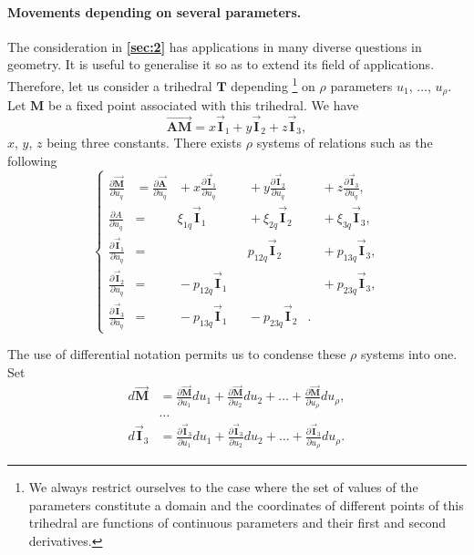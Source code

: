 \documentclass[leqno,11pt]{book}
\numberwithin{equation}{chapter}
\newcommand{\pd}{\partial}
\theoremstyle{shape1}
\theoremstyle{shapesmall}
\newcommand{\fsref}[1]{{\rm\textsection\textbf{\ref{sec:#1}}}}
\newcommand{\rvec}[1]{\vec{\mathbf{#1}}}
\newcommand{\ivec}{\rvec{I}}
\begin{document}
\paragraph{Movements depending on several parameters.}
\label{sec:3}
The consideration in \fsref{2} has applications in many diverse questions in geometry. It is useful to generalise it so as to extend its field of applications. Therefore, let us consider a trihedral $\mathbf{T}$ depending \footnote{We always restrict ourselves to the case where the set of values of the parameters constitute a domain and the coordinates of different points of this trihedral are functions of continuous parameters and their first and second derivatives.} on $\rho$ parameters $u_{1}$, $\dots$, $u_{\rho}$. Let $\mathbf{M}$ be a fixed point associated with this trihedral. We have
\[
\overrightarrow{\mathbf{AM}}=x\ivec_{1}+y\ivec_{2}+z\ivec_{3},
\]
$x$, $y$, $z$ being three constants. There exists $\rho$ systems of relations such as the following
\begin{equation}
  \label{eq:1.3}
  \left\{
    \begin{alignedat}{6}
      \frac{\pd {\rvec{M}}}{\pd u_{q}}&=\frac{\pd {\rvec{A}}}{\pd u_{q}}&{}+x\frac{\pd \ivec_{1}}{\pd u_{q}}&&{}+y\frac{\pd \ivec_{2}}{\pd u_{q}}&&{}+z\frac{\pd \ivec_{3}}{\pd u_{q}},\\
      \frac{\pd A}{\pd u_{q}}&=&{}\xi_{1q}\ivec_{1}&&{}+\xi_{2q}\ivec_{2}&&{}+\xi_{3q}\ivec_{3},\\
      \frac{\pd \ivec_{1}}{\pd u_{q}}&=&&&{}p_{12q}\ivec_{2}&&{}+p_{13q}\ivec_{3},\\
      \frac{\pd \ivec_{2}}{\pd u_{q}}&=&{}-p_{12q}\ivec_{1}&&&&{}+p_{23q}\ivec_{3},\\
      \frac{\pd \ivec_{3}}{\pd u_{q}}&=&{}-p_{13q}\ivec_{1}&&{}-p_{23q}\ivec_{2}&.&
    \end{alignedat}
  \right.
\end{equation}

The use of differential notation permits us to condense these $\rho$ systems into one. Set
\begin{align*}
  d{\rvec{M}}&=\frac{\pd{\rvec{M}}}{\pd u_{1}}du_{1}+\frac{\pd{\rvec{M}}}{\pd u_{2}}du_{2}+\dots+\frac{\pd{\rvec{M}}}{\pd u_{\rho}}du_{\rho},\\
  &\dots\\
  d\ivec_{3}&=\frac{\pd\ivec_{3}}{\pd u_{1}}du_{1}+\frac{\pd \ivec_{3}}{\pd u_{2}}du_{2}+\dots+\frac{\pd \ivec_{3}}{\pd u_{\rho}}du_{\rho}.
\end{align*}
\end{document}
